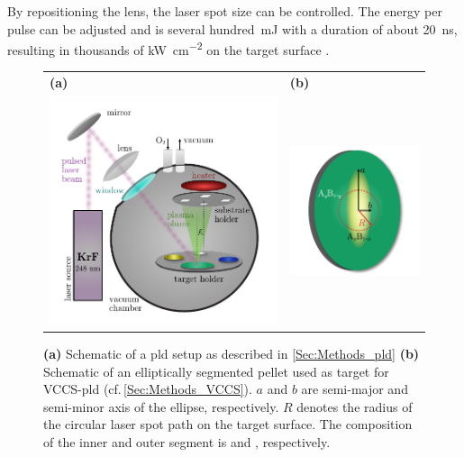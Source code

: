 By repositioning the lens, the laser spot size can be controlled.
The energy per pulse can be adjusted and is several hundred~\unit{\mJ} with a duration of about \qty{20}{\ns}, resulting in thousands of \unit{\kW\per\square\cm} on the target surface
    \cite{lorenz2019}.
\begin{figure}
    \centering
    \begin{tabular}{ll}
        \textbf{(a)}&\textbf{(b)}\\
        \includegraphics[width=9cm,align=c]{fastImages/PLD.pdf}&
        \includegraphics[width=5cm,align=c]{fastImages/target.pdf}  
    \end{tabular}
    \caption{\textbf{(a)} Schematic of a \gls{pld} setup as described in \ref{Sec:Methods_pld} \textbf{(b)} Schematic of an elliptically segmented pellet used as target for \acrshort{VCCS}-\gls{pld} (cf.\,\ref{Sec:Methods_VCCS}).
    $a$ and $b$ are semi-major and semi-minor axis of the ellipse, respectively.
    $R$ denotes the radius of the circular laser spot path on the target surface.
    The composition of the inner and outer segment is  and , respectively.}
    \label{Fig:Methods_pld}
\end{figure}

